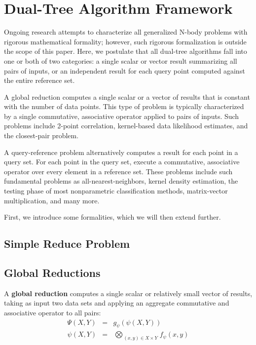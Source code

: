 \documentclass[times, 10pt,twocolumn]{article}
\newcommand{\defterm}[1]{{\bf #1}}
\newcommand{\myOp}[1]{\mathop{\bigotimes\nolimits\!\!_{#1}}}
\newcommand{\letterglob}{\psi}
\newcommand{\outglob}{\Psi}
\newcommand{\inglob}{\psi}
\newcommand{\Opglob}{\myOp{\letterglob}}
\newcommand{\fglob}{f_{\letterglob}}
\newcommand{\gglob}{g_{\letterglob}}
\begin{document}
\section{Dual-Tree Algorithm Framework}

Ongoing research attempts to characterize all generalized N-body problems with rigorous mathematical formality; however, such rigorous formalization is outside the scope of this paper.
Here, we postulate that all dual-tree algorithms fall into one or both of two categories: a single scalar or vector result summarizing all pairs of inputs, or an independent result for each query point computed against the entire reference set.

A global reduction computes a single scalar or a vector of results that is constant with the number of data points.
This type of problem is typically characterized by a single commutative, associative operator applied to pairs of inputs.
Such problems include 2-point correlation, kernel-based data likelihood estimates, and the closest-pair problem.

A query-reference problem alternatively computes a result for each point in a query set.
For each point in the query set, execute a commutative, associative operator over every element in a reference set.
These problems include such fundamental problems as all-nearest-neighbors, kernel density estimation, the testing phase of most nonparametric classification methods, matrix-vector multiplication, and many more.

First, we introduce some formalities, which we will then extend further.

\subsection{Simple Reduce Problem}



\subsection{Global Reductions}


A \defterm{global reduction} computes a single scalar or relatively small vector of results, taking as input two data sets and applying an aggregate commutative and associative operator to all pairs:
\begin{eqnarray*}
\outglob(X, Y) &=& \gglob(\inglob(X, Y))
\\
\inglob(X, Y) &=& \Opglob_{(x, y) \in X \times Y} \fglob(x, y)
\label{eqn:defglob}
\end{eqnarray*}
\end{document}
